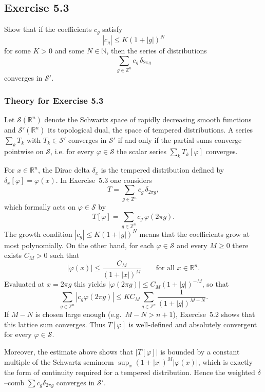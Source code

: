\documentclass[12pt,a4paper]{article}
\theoremstyle{plain}
\theoremstyle{definition}
\theoremstyle{remark}
\theoremstyle{remark}
\begin{document}
\clearpage

\subsection*{Exercise 5.3}
Show that if the coefficients $c_g$ satisfy
\[
|c_g| \le K(1+|g|)^N
\]
for some $K>0$ and some $N\in\mathbb{N}$, then the series of distributions
\[
\sum_{g\in\mathbb{Z}^n} c_g\,\delta_{2\pi g}
\]
converges in $\mathcal{S}'$.

\subsubsection*{Theory for Exercise 5.3}

Let $\mathcal{S}(\mathbb{R}^n)$ denote the Schwartz space of rapidly
decreasing smooth functions and $\mathcal{S}'(\mathbb{R}^n)$ its
topological dual, the space of tempered distributions.  A series
$\sum_{k} T_k$ with $T_k\in\mathcal{S}'$ converges in $\mathcal{S}'$ if
and only if the partial sums converge pointwise on $\mathcal{S}$, i.e.
for every $\varphi\in\mathcal{S}$ the scalar series
$\sum_k T_k[\varphi]$ converges.

For $x\in\mathbb{R}^n$, the Dirac delta $\delta_x$ is the tempered
distribution defined by $\delta_x[\varphi]=\varphi(x)$.  In Exercise~5.3
one considers
\[
T = \sum_{g\in\mathbb{Z}^n} c_g\,\delta_{2\pi g},
\]
which formally acts on $\varphi\in\mathcal{S}$ by
\[
T[\varphi] = \sum_{g\in\mathbb{Z}^n} c_g\,\varphi(2\pi g).
\]
The growth condition $|c_g|\le K(1+|g|)^N$ means that the coefficients
grow at most polynomially.  On the other hand, for each
$\varphi\in\mathcal{S}$ and every $M\ge 0$ there exists $C_M>0$ such
that
\[
|\varphi(x)| \le \frac{C_M}{(1+|x|)^M}\qquad\text{for all }x\in\mathbb{R}^n.
\]
Evaluated at $x=2\pi g$ this yields
$|\varphi(2\pi g)|\le C_M(1+|g|)^{-M}$, so that
\[
\sum_{g\in\mathbb{Z}^n} |c_g\varphi(2\pi g)|
\le K C_M \sum_{g\in\mathbb{Z}^n} \frac{1}{(1+|g|)^{M-N}}.
\]
If $M-N$ is chosen large enough (e.g.\ $M-N>n+1$), Exercise~5.2 shows
that this lattice sum converges.  Thus $T[\varphi]$ is well-defined and
absolutely convergent for every $\varphi\in\mathcal{S}$.

Moreover, the estimate above shows that $|T[\varphi]|$ is bounded by a
constant multiple of the Schwartz seminorm
$\sup_x(1+|x|)^M|\varphi(x)|$, which is exactly the form of continuity
required for a tempered distribution.  Hence the weighted $\delta$--comb
$\sum c_g\delta_{2\pi g}$ converges in $\mathcal{S}'$.
\end{document}
